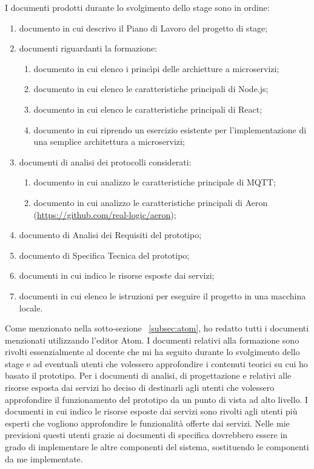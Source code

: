 I documenti prodotti durante lo svolgimento dello stage sono in ordine:
\begin{enumerate}
	\item documento in cui descrivo il Piano di Lavoro del progetto di stage;
	\item documenti riguardanti la formazione:
		\begin{enumerate}
			\item documento in cui elenco i princìpi delle archietture a microservizi;
			\item documento in cui elenco le caratteristiche principali di Node.js;
			\item documento in cui elenco le caratteristiche principali di React;
			\item documento in cui riprendo un esercizio esistente per l'implementazione di una semplice architettura a microservizi;
		\end{enumerate}
		\item documenti di analisi dei protocolli considerati:
		\begin{enumerate}
			\item documento in cui analizzo le caratteristiche principale di MQTT;
			\item documento in cui analizzo le caratteristiche principali di Aeron (\url{https://github.com/real-logic/aeron});
		\end{enumerate}
		\item documento di Analisi dei Requisiti del prototipo;
		\item documento di Specifica Tecnica del prototipo;
		\item documenti in cui indico le risorse esposte dai servizi;
		\item documenti in cui elenco le istruzioni per eseguire il progetto in una macchina locale.
\end{enumerate}
Come menzionato nella sotto-sezione ~\ref{subsec:atom}, ho redatto tutti i documenti menzionati utilizzando l'editor Atom.
I documenti relativi alla formazione sono rivolti essenzialmente al docente che mi ha seguito durante lo svolgimento dello stage e ad eventuali utenti che volessero approfondire i contenuti teorici su cui ho basato il prototipo.
Per i documenti di analisi, di progettazione e relativi alle risorse esposta dai servizi ho deciso di destinarli agli utenti che volessero approfondire il funzionamento del prototipo da un punto di vista ad alto livello.
I documenti in cui indico le risorse esposte dai servizi sono rivolti agli utenti più esperti che vogliono approfondire le funzionalità offerte dai servizi. Nelle mie previsioni questi utenti grazie ai documenti di specifica dovrebbero essere in grado di implementare le altre componenti del sistema, sostituendo le componenti da me implementate.
